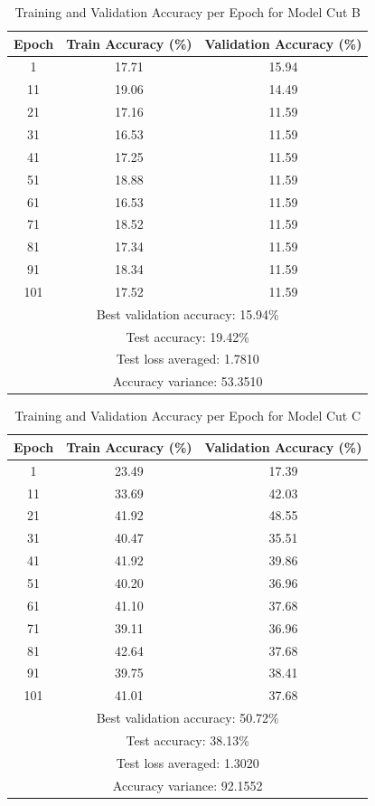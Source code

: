 \documentclass[11pt]{scrartcl}
\begin{document}
\begin{table}[htbp]
\centering
\caption{Training and Validation Accuracy per Epoch for Model Cut B}
\begin{tabular}{ccc}
\toprule
\textbf{Epoch} & \textbf{Train Accuracy (\%)} & \textbf{Validation Accuracy (\%)} \\
\midrule
1    & 17.71  & 15.94 \\
11   & 19.06  & 14.49 \\
21   & 17.16  & 11.59 \\
31   & 16.53  & 11.59 \\
41   & 17.25  & 11.59 \\
51   & 18.88  & 11.59 \\
61   & 16.53  & 11.59 \\
71   & 18.52  & 11.59 \\
81   & 17.34  & 11.59 \\
91   & 18.34  & 11.59 \\
101  & 17.52  & 11.59 \\
\midrule
\multicolumn{3}{c}{Best validation accuracy: 15.94\%} \\
\midrule
\multicolumn{3}{c}{Test accuracy: 19.42\%} \\
\multicolumn{3}{c}{Test loss averaged: 1.7810} \\
\multicolumn{3}{c}{Accuracy variance: 53.3510} \\
\bottomrule
\end{tabular}
\label{tab:task3-bonus-cutb-accuracy}
\end{table}

\begin{table}[htbp]
\centering
\caption{Training and Validation Accuracy per Epoch for Model Cut C}
\begin{tabular}{ccc}
\toprule
\textbf{Epoch} & \textbf{Train Accuracy (\%)} & \textbf{Validation Accuracy (\%)} \\
\midrule
1    & 23.49  & 17.39 \\
11   & 33.69  & 42.03 \\
21   & 41.92  & 48.55 \\
31   & 40.47  & 35.51 \\
41   & 41.92  & 39.86 \\
51   & 40.20  & 36.96 \\
61   & 41.10  & 37.68 \\
71   & 39.11  & 36.96 \\
81   & 42.64  & 37.68 \\
91   & 39.75  & 38.41 \\
101  & 41.01  & 37.68 \\
\midrule
\multicolumn{3}{c}{Best validation accuracy: 50.72\%} \\
\midrule
\multicolumn{3}{c}{Test accuracy: 38.13\%} \\
\multicolumn{3}{c}{Test loss averaged: 1.3020} \\
\multicolumn{3}{c}{Accuracy variance: 92.1552} \\
\bottomrule
\end{tabular}
\label{tab:task3-bonus-cutc-accuracy}
\end{table}
\end{document}

